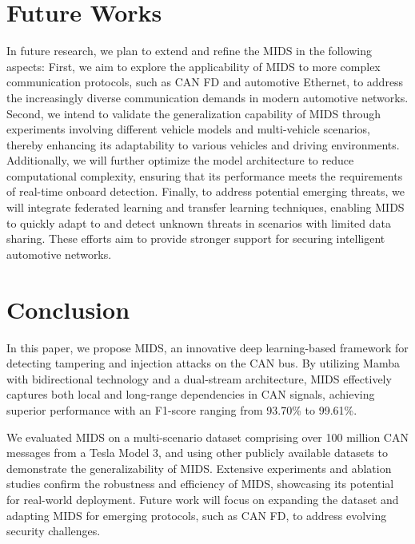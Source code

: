 \documentclass[lettersize,journal]{IEEEtran}
\begin{document}
\section{Future Works}
In future research, we plan to extend and refine the MIDS in the following aspects: First, we aim to explore the applicability of MIDS to more complex communication protocols, such as CAN FD and automotive Ethernet, to address the increasingly diverse communication demands in modern automotive networks. Second, we intend to validate the generalization capability of MIDS through experiments involving different vehicle models and multi-vehicle scenarios, thereby enhancing its adaptability to various vehicles and driving environments. Additionally, we will further optimize the model architecture to reduce computational complexity, ensuring that its performance meets the requirements of real-time onboard detection. Finally, to address potential emerging threats, we will integrate federated learning and transfer learning techniques, enabling MIDS to quickly adapt to and detect unknown threats in scenarios with limited data sharing. These efforts aim to provide stronger support for securing intelligent automotive networks.

\section{Conclusion}
In this paper, we propose MIDS, an innovative deep learning-based framework for detecting tampering and injection attacks on the CAN bus. By utilizing Mamba with bidirectional technology and a dual-stream architecture, MIDS effectively captures both local and long-range dependencies in CAN signals, achieving superior performance with an F1-score ranging from 93.70\% to 99.61\%.

We evaluated MIDS on a multi-scenario dataset comprising over 100 million CAN messages from a Tesla Model 3, and using other publicly available datasets to demonstrate the generalizability of MIDS. Extensive experiments and ablation studies confirm the robustness and efficiency of MIDS, showcasing its potential for real-world deployment. Future work will focus on expanding the dataset and adapting MIDS for emerging protocols, such as CAN FD, to address evolving security challenges.

\vfill


\end{document}
